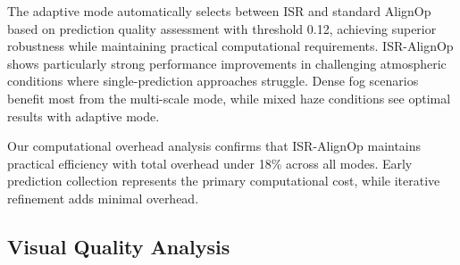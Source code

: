 \documentclass{article}
\begin{document}
The adaptive mode automatically selects between ISR and standard AlignOp based on prediction quality assessment with threshold 0.12, achieving superior robustness while maintaining practical computational requirements. ISR-AlignOp shows particularly strong performance improvements in challenging atmospheric conditions where single-prediction approaches struggle. Dense fog scenarios benefit most from the multi-scale mode, while mixed haze conditions see optimal results with adaptive mode.

Our computational overhead analysis confirms that ISR-AlignOp maintains practical efficiency with total overhead under 18\% across all modes. Early prediction collection represents the primary computational cost, while iterative refinement adds minimal overhead.

\subsection{Visual Quality Analysis}
\end{document}
